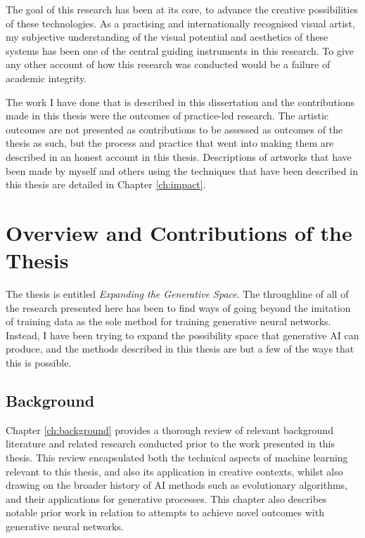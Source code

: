 The goal of this research has been at its core, to advance the creative possibilities of these technologies. 
As a practising and internationally recognised visual artist, my subjective understanding of the visual potential and aesthetics of these systems has been one of the central guiding instruments in this research. 
To give any other account of how this research was conducted would be a failure of academic integrity. 

The work  I have done that is described in this dissertation and the contributions made in this thesis were the outcomes of practice-led research. 
The artistic outcomes are not presented as contributions to be assessed as outcomes of the thesis as such, but the process and practice that went into making them are described in an honest account in this thesis. 
Descriptions of artworks that have been made by myself and others using the techniques that have been described in this thesis are detailed in Chapter \ref{ch:impact}.

\section{Overview and Contributions of the Thesis}

The thesis is entitled \textit{Expanding the Generative Space}. 
The throughline of all of the research presented here has been to find ways of going beyond the imitation of training data as the sole method for training generative neural networks. 
Instead, I have been trying to expand the possibility space that generative AI can produce, and the methods described in this thesis are but a few of the ways that this is possible. 

\subsection{Background}

Chapter \ref{ch:background} provides a thorough review of relevant background literature and related research conducted prior to the work presented in this thesis.
This review encapsulated both the technical aspects of machine learning relevant to this thesis, and also its application in creative contexts, whilst also drawing on the broader history of AI methods such as evolutionary algorithms, and their applications for generative processes. 
This chapter also describes notable prior work in relation to attempts to achieve novel outcomes with generative neural networks.

